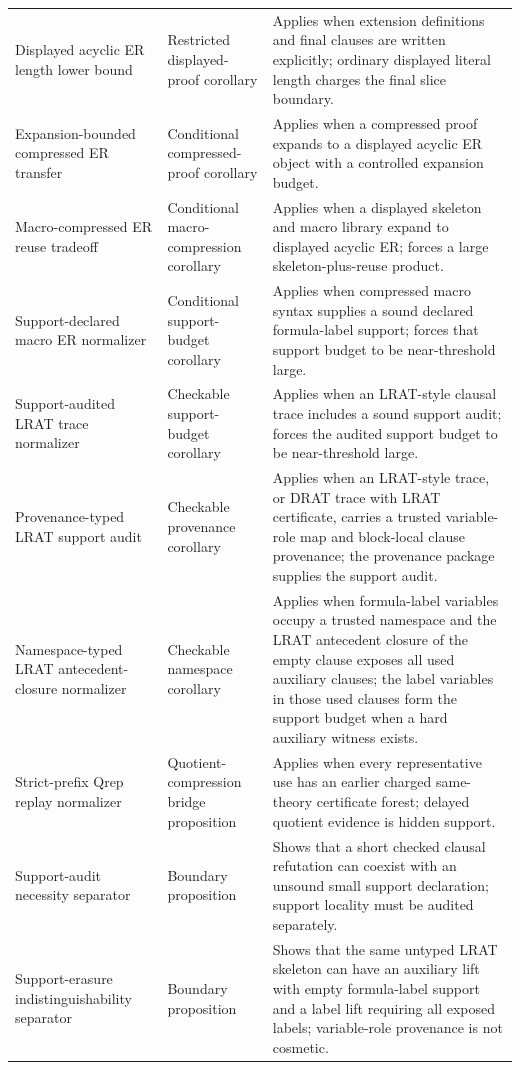 \documentclass[11pt]{article}
\theoremstyle{definition}
\begin{document}
{\begin{longtable}{@{}p{}p{}p{}@{}}
Displayed acyclic ER length lower bound & Restricted displayed-proof corollary & Applies when extension definitions and final clauses are written explicitly; ordinary displayed literal length charges the final slice boundary. \\
Expansion-bounded compressed ER transfer & Conditional compressed-proof corollary & Applies when a compressed proof expands to a displayed acyclic ER object with a controlled expansion budget. \\
Macro-compressed ER reuse tradeoff & Conditional macro-compression corollary & Applies when a displayed skeleton and macro library expand to displayed acyclic ER; forces a large skeleton-plus-reuse product. \\
Support-declared macro ER normalizer & Conditional support-budget corollary & Applies when compressed macro syntax supplies a sound declared formula-label support; forces that support budget to be near-threshold large. \\
Support-audited LRAT trace normalizer & Checkable support-budget corollary & Applies when an LRAT-style clausal trace includes a sound support audit; forces the audited support budget to be near-threshold large. \\
Provenance-typed LRAT support audit & Checkable provenance corollary & Applies when an LRAT-style trace, or DRAT trace with LRAT certificate, carries a trusted variable-role map and block-local clause provenance; the provenance package supplies the support audit. \\
Namespace-typed LRAT antecedent-closure normalizer & Checkable namespace corollary & Applies when formula-label variables occupy a trusted namespace and the LRAT antecedent closure of the empty clause exposes all used auxiliary clauses; the label variables in those used clauses form the support budget when a hard auxiliary witness exists. \\
Strict-prefix Qrep replay normalizer & Quotient-compression bridge proposition & Applies when every representative use has an earlier charged same-theory certificate forest; delayed quotient evidence is hidden support. \\
Support-audit necessity separator & Boundary proposition & Shows that a short checked clausal refutation can coexist with an unsound small support declaration; support locality must be audited separately. \\
Support-erasure indistinguishability separator & Boundary proposition & Shows that the same untyped LRAT skeleton can have an auxiliary lift with empty formula-label support and a label lift requiring all exposed labels; variable-role provenance is not cosmetic. \\

\end{longtable}}
\end{document}
